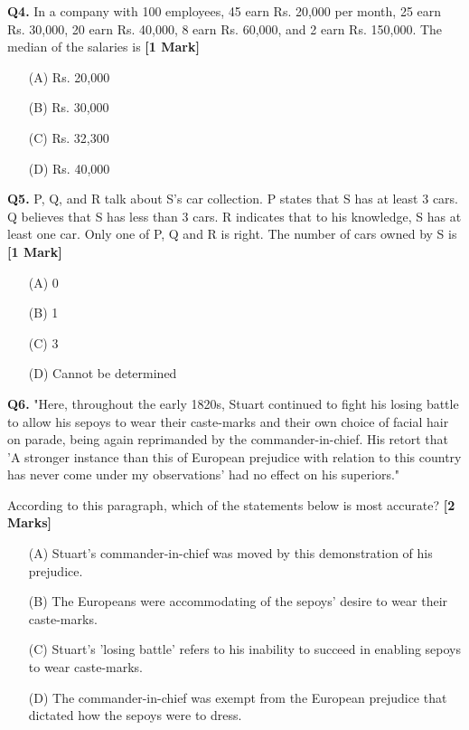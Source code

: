 \documentclass[11pt]{article}
\newcommand{\questiona}[2]{
    \noindent\textbf{Q#2.} #1 \hfill \textbf{[1 Mark]}
}
\newcommand{\questionb}[2]{
    \noindent\textbf{Q#2.} #1 \hfill \textbf{[2 Marks]}
}
\begin{document}
\vspace{0.5cm}

\questiona{In a company with 100 employees, 45 earn Rs. 20,000 per month, 25 earn Rs. 30,000, 20 earn Rs. 40,000, 8 earn Rs. 60,000, and 2 earn Rs. 150,000. The median of the salaries is}{4}
\begin{enumerate}
    \item[(A)] Rs. 20,000
    \item[(B)] Rs. 30,000  
    \item[(C)] Rs. 32,300
    \item[(D)] Rs. 40,000
\end{enumerate}

\vspace{0.5cm}

\questiona{P, Q, and R talk about S's car collection. P states that S has at least 3 cars. Q believes that S has less than 3 cars. R indicates that to his knowledge, S has at least one car. Only one of P, Q and R is right. The number of cars owned by S is}{5}
\begin{enumerate}
    \item[(A)] 0
    \item[(B)] 1  
    \item[(C)] 3
    \item[(D)] Cannot be determined
\end{enumerate}

\vspace{0.5 cm}

\questionb{"Here, throughout the early 1820s, Stuart continued to fight his losing battle to allow his sepoys to wear their caste-marks and their own choice of facial hair on parade, being again reprimanded by the commander-in-chief. His retort that 'A stronger instance than this of European prejudice with relation to this country has never come under my observations' had no effect on his superiors."

According to this paragraph, which of the statements below is most accurate?}{6}
\begin{enumerate}
    \item[(A)] Stuart's commander-in-chief was moved by this demonstration of his prejudice.
    \item[(B)] The Europeans were accommodating of the sepoys' desire to wear their caste-marks.  
    \item[(C)] Stuart's 'losing battle' refers to his inability to succeed in enabling sepoys to wear caste-marks.
    \item[(D)] The commander-in-chief was exempt from the European prejudice that dictated how the sepoys were to dress.
\end{enumerate}
\end{document}
